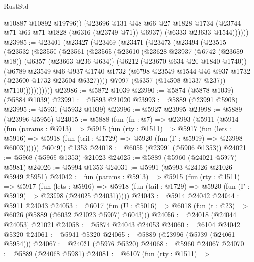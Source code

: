 \begin{lexlean}{RustStd}
\begin{coremodule}
                @10887
                @10892
                @19796))
            (@23696
              @131
              @48
              @66
              @27
              @1828
              @1734
              (@23744 @71 @66 @71 @1828 (@6316 (@23749 @71)) @6937)
              (@6333 @23633 @1544))))))
@23985 := @23401
    (@23427
      (@23469
        (@23471
          (@23473
            (@23494
              (@23515
                (@23532
                  (@23550
                    (@23561
                      (@23565
                        (@23610
                          (@23628
                            @23937
                            (@6742 (@23659 @18))
                            (@6357 (@23663 @236 @634))
                            (@6212 (@23670 @634 @20 @1840 @1740))
                            (@6789
                              @23549
                              @46
                              @937
                              @1740
                              @1732
                              (@6798 @23549 @1544 @46 @937 @1732 (@23600 @1732 @23604 @6327))))
                          @7097
                          (@6357 (@14508 @1337 @237))
                          @7110)))))))))))
@23986 := @5872 @1039
@23990 := @5874 (@5878 @1039) (@5884 @1039)
@23991 := @5893 @21020
@23993 := @5889 (@23991 @5908)
@23995 := @5931 (@5932 @1039)
@23996 := @5927 @23995
@23998 := @5889 (@23996 @5956)
@24015 := @5888
    (fun (fn : @7) =>
    @23993
      (@5911
        (@5914
          (fun (params : @5913) =>
          @5915
            (fun (rty : @1511) =>
            @5917
              (fun (lets : @5916) =>
              @5918 (fun (tail : @1729) => @5920 (fun (Γ : @5919) => @23998 @6003))))))
        @6049))
    @1353
@24018 := @6055 (@23991 (@5906 @1353))
@24021 := @5968 (@5969 @1353) @21023
@24025 := @5889 (@5960 (@24021 @5977) @5981)
@24026 := @5994 @1353
@24031 := @5991 (@5993 @24026 @21026 @5949 @5951)
@24042 := fun (params : @5913) =>
  @5915
    (fun (rty : @1511) =>
    @5917
      (fun (lets : @5916) =>
      @5918 (fun (tail : @1729) => @5920 (fun (Γ : @5919) => @23998 (@24025 @24031)))))
@24043 := @5914 @24042
@24044 := @5911 @24043
@24053 := @6017
    (fun (U : @6016) => @6018 (fun (t : @23) => @6026 (@5889 (@6032 @21023 @5907) @6043)))
@24056 := @24018 (@24044 @24053) @21021
@24058 := @5874 @24043 @24053
@24060 := @6104 @24042 @5320
@24061 := @5941 @5320
@24065 := @5889 (@23996 (@5939 (@24061 @5954)))
@24067 := @24021 (@5976 @5320)
@24068 := @5960 @24067
@24070 := @5889 (@24068 @5981)
@24081 := @6107
    (fun (rty : @1511) =>

\end{coremodule}
\end{lexlean}
